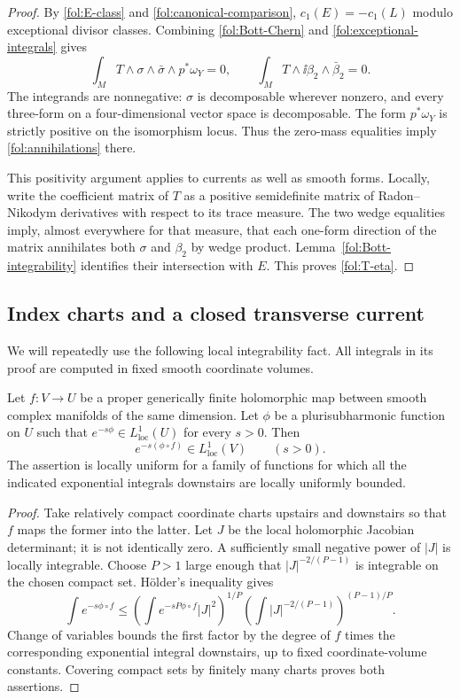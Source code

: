 \begin{proof}
By \eqref{fol:E-class} and \eqref{fol:canonical-comparison},
$c_1(E)=-c_1(L)$ modulo exceptional divisor classes.  Combining
\eqref{fol:Bott-Chern} and \eqref{fol:exceptional-integrals} gives
\[
 \int_M T\wedge\sigma\wedge\bar\sigma\wedge p^*\omega_Y=0,
 \qquad
 \int_M T\wedge\ii\beta_2\wedge\bar\beta_2=0.
\]
The integrands are nonnegative: $\sigma$ is decomposable wherever
nonzero, and every three-form on a four-dimensional vector space is
decomposable.  The form $p^*\omega_Y$ is strictly positive on the
isomorphism locus.  Thus the zero-mass equalities imply
\eqref{fol:annihilations} there.

This positivity argument applies to currents as well as smooth forms.
Locally, write the coefficient matrix of $T$ as a positive semidefinite
matrix of Radon--Nikodym derivatives with respect to its trace measure.
The two wedge equalities imply, almost everywhere for that measure, that
each one-form direction of the matrix annihilates both $\sigma$ and
$\beta_2$ by wedge product.  Lemma~\ref{fol:Bott-integrability} identifies
their intersection with $E$.  This proves \eqref{fol:T-eta}.
\end{proof}

\subsection{Index charts and a closed transverse current}

We will repeatedly use the following local integrability fact.  All
integrals in its proof are computed in fixed smooth coordinate volumes.

\begin{lemma}\label{fol:Jacobian-integrability}
Let $f\colon V\to U$ be a proper generically finite holomorphic map
between smooth complex manifolds of the same dimension.  Let $\phi$ be
a plurisubharmonic function on $U$ such that
$e^{-s\phi}\in L^1_{\mathrm{loc}}(U)$ for every $s>0$.  Then
\[
 e^{-s(\phi\circ f)}\in L^1_{\mathrm{loc}}(V)
 \qquad(s>0).
\]
The assertion is locally uniform for a family of functions for which
all the indicated exponential integrals downstairs are locally uniformly
bounded.
\end{lemma}

\begin{proof}
Take relatively compact coordinate charts upstairs and downstairs so that
$f$ maps the former into the latter.  Let $J$ be the local holomorphic
Jacobian determinant; it is not identically zero.  A sufficiently small
negative power of $|J|$ is locally integrable.  Choose $P>1$ large enough
that $|J|^{-2/(P-1)}$ is integrable on the chosen compact set.  H\"older's
inequality gives
\begin{equation}\label{fol:Jacobian-Holder}
 \int e^{-s\phi\circ f}
 \leq
 \left(\int e^{-sP\phi\circ f}|J|^2\right)^{1/P}
 \left(\int |J|^{-2/(P-1)}\right)^{(P-1)/P}.
\end{equation}
Change of variables bounds the first factor by the degree of $f$ times
the corresponding exponential integral downstairs, up to fixed
coordinate-volume constants.  Covering compact sets by finitely many
charts proves both assertions.
\end{proof}

